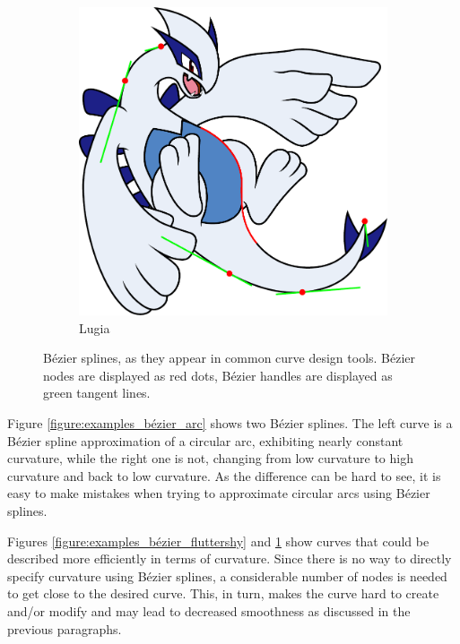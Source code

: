 \documentclass[a4paper]{article}
\begin{document}
\begin{figure}[htb]
\begin{subfigure}[b]{\textwidth / 2}
						\includegraphics[width=\textwidth]{content/output/examples_bezier_lugia.pdf}
						\caption{Lugia \cite{lugia}}
						\label{figure:examples_bézier_lugia}
					\end{subfigure}
					\caption{Bézier splines, as they appear in common curve design tools. Bézier nodes are displayed as red dots, Bézier handles are displayed as green tangent lines.}
					\label{figure:examples_bézier}
				\end{figure}

				Figure \ref{figure:examples_bézier_arc} shows two Bézier splines. The left curve is a Bézier spline approximation of a circular arc, exhibiting nearly constant curvature, while the right one is not, changing from low curvature to high curvature and back to low curvature. As the difference can be hard to see, it is easy to make mistakes when trying to approximate circular arcs using Bézier splines.

				Figures \ref{figure:examples_bézier_fluttershy} and \ref{figure:examples_bézier_lugia} show curves that could be described more efficiently in terms of curvature. Since there is no way to directly specify curvature using Bézier splines, a considerable number of nodes is needed to get close to the desired curve. This, in turn, makes the curve hard to create and/or modify and may lead to decreased smoothness as discussed in the previous paragraphs.
\end{document}
